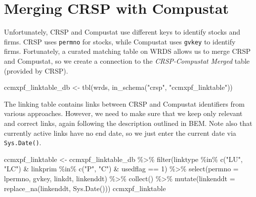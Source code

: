 \documentclass[
]{krantz}
\newenvironment{Shaded}{\begin{snugshade}}{\end{snugshade}}
\newcommand{\AttributeTok}[1]{\textcolor[rgb]{0.61,0.61,0.61}{#1}}
\newcommand{\DecValTok}[1]{\textcolor[rgb]{0.06,0.06,0.06}{#1}}
\newcommand{\FunctionTok}[1]{\textcolor[rgb]{0,0,0}{#1}}
\newcommand{\NormalTok}[1]{#1}
\newcommand{\OtherTok}[1]{\textcolor[rgb]{0.37,0.37,0.37}{#1}}
\newcommand{\SpecialCharTok}[1]{\textcolor[rgb]{0,0,0}{#1}}
\newcommand{\StringTok}[1]{\textcolor[rgb]{0.5,0.5,0.5}{#1}}
\begin{document}
\hypertarget{merging-crsp-with-compustat}{%
\section{Merging CRSP with Compustat}\label{merging-crsp-with-compustat}}

Unfortunately, CRSP and Compustat use different keys to identify stocks and firms. CRSP uses \texttt{permno} for stocks, while Compustat uses \texttt{gvkey} to identify firms. Fortunately, a curated matching table on WRDS allows us to merge CRSP and Compustat, so we create a connection to the \emph{CRSP-Compustat Merged} table (provided by CRSP).

\begin{Shaded}
\begin{Highlighting}[]
\NormalTok{ccmxpf\_linktable\_db }\OtherTok{\textless{}{-}} \FunctionTok{tbl}\NormalTok{(wrds, }\FunctionTok{in\_schema}\NormalTok{(}\StringTok{"crsp"}\NormalTok{, }\StringTok{"ccmxpf\_linktable"}\NormalTok{))}
\end{Highlighting}
\end{Shaded}

The linking table contains links between CRSP and Compustat identifiers from various approaches. However, we need to make sure that we keep only relevant and correct links, again following the description outlined in BEM. Note also that currently active links have no end date, so we just enter the current date via \texttt{Sys.Date()}.

\begin{Shaded}
\begin{Highlighting}[]
\NormalTok{ccmxpf\_linktable }\OtherTok{\textless{}{-}}\NormalTok{ ccmxpf\_linktable\_db }\SpecialCharTok{\%\textgreater{}\%}
  \FunctionTok{filter}\NormalTok{(linktype }\SpecialCharTok{\%in\%} \FunctionTok{c}\NormalTok{(}\StringTok{"LU"}\NormalTok{, }\StringTok{"LC"}\NormalTok{) }\SpecialCharTok{\&}
\NormalTok{    linkprim }\SpecialCharTok{\%in\%} \FunctionTok{c}\NormalTok{(}\StringTok{"P"}\NormalTok{, }\StringTok{"C"}\NormalTok{) }\SpecialCharTok{\&}
\NormalTok{    usedflag }\SpecialCharTok{==} \DecValTok{1}\NormalTok{) }\SpecialCharTok{\%\textgreater{}\%}
  \FunctionTok{select}\NormalTok{(}\AttributeTok{permno =}\NormalTok{ lpermno, gvkey, linkdt, linkenddt) }\SpecialCharTok{\%\textgreater{}\%}
  \FunctionTok{collect}\NormalTok{() }\SpecialCharTok{\%\textgreater{}\%}
  \FunctionTok{mutate}\NormalTok{(}\AttributeTok{linkenddt =} \FunctionTok{replace\_na}\NormalTok{(linkenddt, }\FunctionTok{Sys.Date}\NormalTok{()))}
\NormalTok{ccmxpf\_linktable}
\end{Highlighting}
\end{Shaded}
\end{document}
